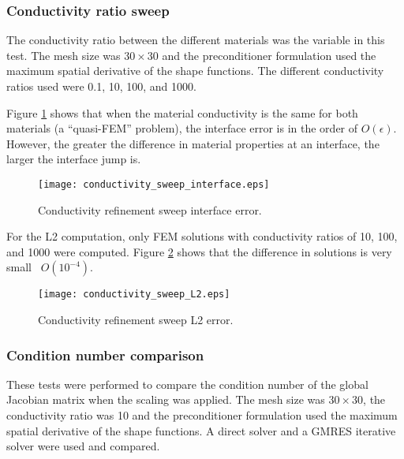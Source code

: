 \subsubsection{Conductivity ratio sweep}

The conductivity ratio between the different materials was the variable in this test. The mesh size was $30 \times 30$ and the preconditioner formulation used the maximum spatial derivative of the shape functions. The different conductivity ratios used were 0.1, 10, 100, and 1000.

Figure \ref{fig:conductivity-sweep-interface} shows that when the material conductivity is the same for both materials (a ``quasi-FEM'' problem), the interface error is in the order of $O(\epsilon)$. However, the greater the difference in material properties at an interface, the larger the interface jump is.
%
\begin{figure}[H]
	\centering
	\texttt{[image: conductivity\_sweep\_interface.eps]}
	\caption[Conductivity refinement sweep interface error]{Conductivity refinement sweep interface error.}
	\label{fig:conductivity-sweep-interface}
\end{figure}

For the L2 computation, only FEM solutions with conductivity ratios of 10, 100, and 1000 were computed. Figure \ref{fig:conductivity-sweep-L2} shows that the difference in solutions is very small ~$O(10^{-4})$.
%
\begin{figure}[H]
	\centering
	\texttt{[image: conductivity\_sweep\_L2.eps]}
	\caption[Conductivity refinement sweep L2 error]{Conductivity refinement sweep L2 error.}
	\label{fig:conductivity-sweep-L2}
\end{figure}
%

\subsubsection{Condition number comparison}

These tests were performed to compare the condition number of the global Jacobian matrix when the scaling was applied. The mesh size was $30 \times 30$, the conductivity ratio was 10 and the preconditioner formulation used the maximum spatial derivative of the shape functions. A direct solver and a GMRES iterative solver were used and compared.

